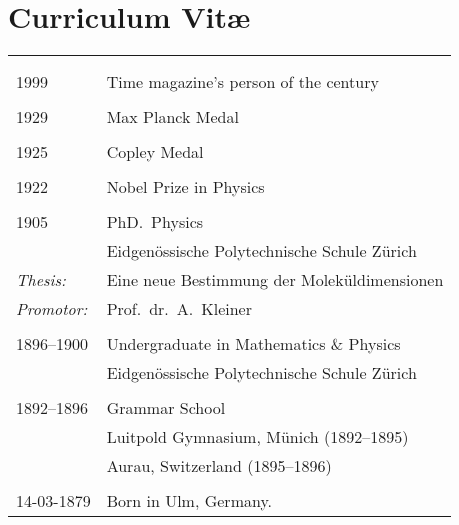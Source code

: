 \chapter*{Curriculum Vit\ae}

\makeatletter
\authors{\@firstname\ {\titleshape\@lastname}}
\makeatother

\noindent
\begin{center}
\begin{tabular}{l l}
\multicolumn{2}{c}{} \\
\medskip \\
1999 & Time magazine's person of the century \\
& \\
1929 & Max Planck Medal \\
& \\
1925 & Copley Medal \\
& \\
1922 & Nobel Prize in Physics \\
& \\
1905 & PhD.\ Physics \\ 
& Eidgen\"ossische Polytechnische Schule Z\"urich \\ 
\textit{Thesis:} & Eine neue Bestimmung der Molek\"uldimensionen \\
\textit{Promotor:} & Prof.\ dr.\ A.\ Kleiner \\
& \\
1896--1900 & Undergraduate in Mathematics \& Physics \\
& Eidgen\"ossische Polytechnische Schule Z\"urich \\
& \\
1892--1896 & Grammar School \\
& Luitpold Gymnasium, M\"unich (1892--1895)\\
& Aurau, Switzerland (1895--1896) \\
& \\
14-03-1879 & Born in Ulm, Germany.
\end{tabular}
\end{center}


